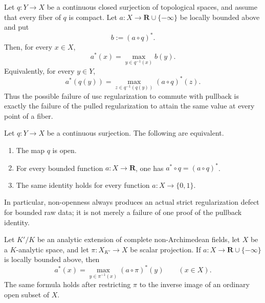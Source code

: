 
\begin{lemma}
\label{lem:p031-perfect-pullback-usc}
Let $q:Y\to X$ be a continuous closed surjection of topological spaces,
and assume that every fiber of $q$ is compact.  Let
$a:X\to\mathbf R\cup\{-\infty\}$ be locally bounded above and put
\[
             b:=(a\circ q)^*.
\]
Then, for every $x\in X$,
\begin{equation}
\label{eq:p031-perfect-pullback-usc}
             a^*(x)=\max_{y\in q^{-1}(x)} b(y).
\end{equation}
Equivalently, for every $y\in Y$,
\begin{equation}
\label{eq:p031-fiber-maximum-pullback}
 a^*(q(y))
   =\max_{z\in q^{-1}(q(y))}(a\circ q)^*(z).
\end{equation}
Thus the possible failure of usc regularization to commute with pullback is
exactly the failure of the pulled regularization to attain the same value at
every point of a fiber.
\end{lemma}

\begin{proposition}
\label{prop:p031-open-map-characterization}
Let $q:Y\to X$ be a continuous surjection.  The following are equivalent.
\begin{enumerate}
\item The map $q$ is open.
\item For every bounded function $a:X\to\mathbf R$, one has
      $a^*\circ q=(a\circ q)^*$.
\item The same identity holds for every function $a:X\to\{0,1\}$.
\end{enumerate}
In particular, non-openness always produces an actual strict
regularization defect for bounded raw data; it is not merely a failure of
one proof of the pullback identity.
\end{proposition}

\begin{corollary}
\label{cor:p031-scalar-fiber-maximum}
Let $K'/K$ be an analytic extension of complete non-Archimedean fields,
let $X$ be a $K$-analytic space, and let
$
 \pi:X_{K'}\to X
$
be scalar projection.  If $a:X\to\mathbf R\cup\{-\infty\}$ is locally
bounded above, then
\begin{equation}
\label{eq:p031-scalar-fiber-maximum}
 a^*(x)
   =\max_{y\in\pi^{-1}(x)}(a\circ\pi)^*(y)
       \qquad(x\in X).
\end{equation}
The same formula holds after restricting $\pi$ to the inverse image of
an ordinary open subset of $X$.
\end{corollary}

